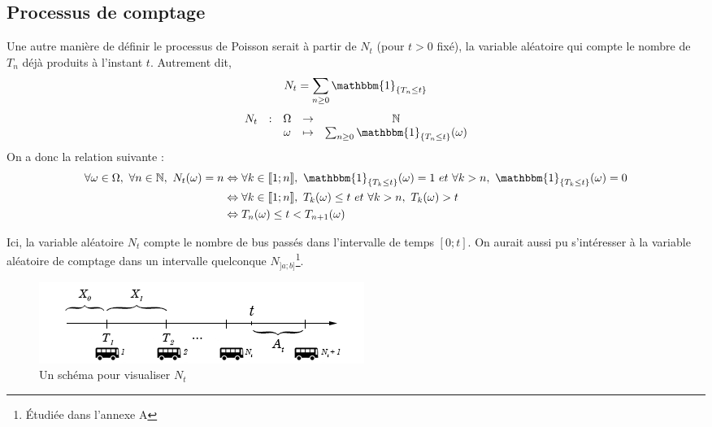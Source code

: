 \documentclass[a4paper, titlepage]{livret} %
\begin{document}
			\subsection{Processus de comptage}
				Une autre manière de définir le processus de Poisson serait à partir de $N_{t}$ (pour $t > 0$ fixé), la variable aléatoire qui \og compte \fg{} le nombre de $T_{n}$ déjà produits à l'instant $t$.
				Autrement dit, 
				\[
					N_{t} = \sum_{n \geq 0} \mathbbm{1}_{\{T_{n} \leq t\}}
				\]
				\[\begin{array}{ccccc}
					N_{t} & : & \Omega & \to & \mathbb{N} \\
					  	  &   & \omega & \mapsto & \sum_{n \geq 0} \mathbbm{1}_{\{T_{n} \leq t\}}(\omega)\\
				\end{array}\]
				On a donc la relation suivante :
				\[\begin{aligned}
					\forall \omega \in \Omega, \ \forall n \in \mathbb{N}, \ N_{t}(\omega) = n & \Leftrightarrow \forall k \in \llbracket 1;n \rrbracket, \ \mathbbm{1}_{\{T_{k} \leq t\}}(\omega) = 1 \ et \ \forall k > n, \ \mathbbm{1}_{\{T_{k} \leq t\}}(\omega) = 0\\
																							   & \Leftrightarrow \forall k \in \llbracket 1;n \rrbracket, \ T_{k}(\omega) \leq t \ et \ \forall k > n, \ T_{k}(\omega) > t\\
														  									   & \Leftrightarrow T_{n}(\omega) \leq t < T_{n + 1}(\omega)
				\end{aligned}\]

				Ici, la variable aléatoire $N_{t}$ compte le nombre de bus passés dans l'intervalle de temps $[0;t]$.
				On aurait aussi pu s'intéresser à la variable aléatoire de comptage dans un intervalle quelconque $N_{]a;b]}$\footnote{Étudiée dans l'annexe A}.
				\begin{figure}[!ht]
					\centering
  						\includegraphics[scale=0.6]{g2.png}
  						\caption{Un schéma pour visualiser $N_{t}$}
				\end{figure}
\end{document}
